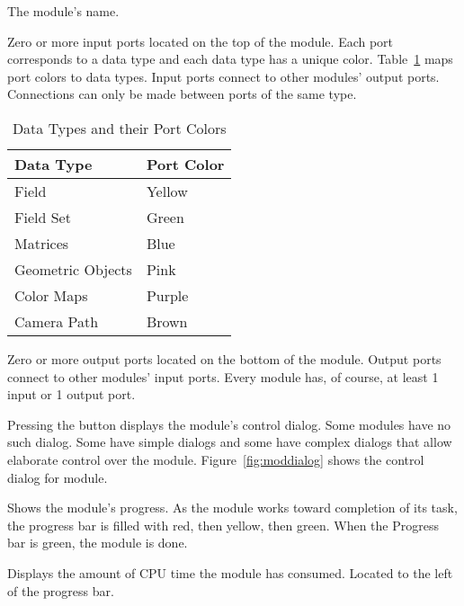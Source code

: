 \begin{description}
   The module's name.
  
   Zero or more input ports located on the top
  of the module.  Each port corresponds to a data type and each data
  type has a unique color.  Table~\ref{tab:portcolors} maps port
  colors to data types.  Input ports connect to other modules' output
  ports.  Connections can only be made between ports of the same type.

  \begin{table}[htbp]
    \begin{center}
      \begin{tabular}{|l|l|}
        \hline
        \textbf{Data Type} & \textbf{Port Color} \\
        \hline
        Field & Yellow \\
        Field Set & Green \\
        Matrices & Blue \\
        Geometric Objects & Pink \\
        Color Maps & Purple \\
        Camera Path & Brown \\
        \hline
      \end{tabular}
      \caption{Data Types and their Port Colors}
      \label{tab:portcolors}
    \end{center}
  \end{table}
  
   Zero or more output ports located on the
  bottom of the module.  Output ports connect to other modules' input
  ports.  Every module has, of course, at least 1 input or 1 output
  port.
  
   Pressing the  button displays the
  module's control dialog. Some modules have no such dialog. Some have
  simple dialogs and some have complex dialogs that allow
  elaborate control over the module.  Figure~\ref{fig:moddialog} shows
  the control dialog for  module.
  
   Shows the module's progress.  As the module
  works toward completion of its task, the progress bar is filled
  with red, then yellow, then green.  When the Progress bar
  is green, the module is done.
  
   Displays the amount of CPU time the module has
  consumed.  Located to the left of the progress bar.
  

\end{description}
